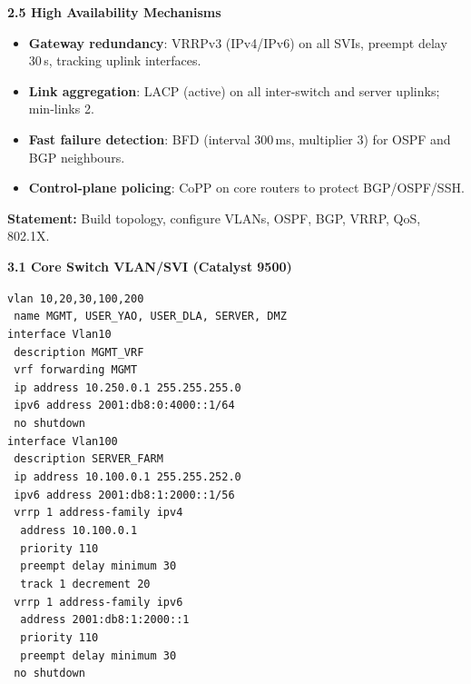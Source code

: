 \documentclass[11pt]{article}
\begin{document}
\begin{exoresolu}
\textbf{2.5 High Availability Mechanisms}
\begin{itemize}
    \item \textbf{Gateway redundancy}: VRRPv3 (IPv4/IPv6) on all SVIs, preempt delay 30\,s, tracking uplink interfaces.
    \item \textbf{Link aggregation}: LACP (active) on all inter-switch and server uplinks; min-links 2.
    \item \textbf{Fast failure detection}: BFD (interval 300\,ms, multiplier 3) for OSPF and BGP neighbours.
    \item \textbf{Control-plane policing}: CoPP on core routers to protect BGP/OSPF/SSH.
\end{itemize}
\end{exoresolu}

\begin{exoresolu}
\textbf{Statement:} Build topology, configure VLANs, OSPF, BGP, VRRP, QoS, 802.1X.

\tcblower
\textbf{3.1 Core Switch VLAN/SVI (Catalyst 9500)}\par
\texttt{vlan 10,20,30,100,200}\\
\texttt{\ name MGMT, USER\_YAO, USER\_DLA, SERVER, DMZ}\\
\texttt{interface Vlan10}\\
\texttt{\ description MGMT\_VRF}\\
\texttt{\ vrf forwarding MGMT}\\
\texttt{\ ip address 10.250.0.1 255.255.255.0}\\
\texttt{\ ipv6 address 2001:db8:0:4000::1/64}\\
\texttt{\ no shutdown}\\
\texttt{interface Vlan100}\\
\texttt{\ description SERVER\_FARM}\\
\texttt{\ ip address 10.100.0.1 255.255.252.0}\\
\texttt{\ ipv6 address 2001:db8:1:2000::1/56}\\
\texttt{\ vrrp 1 address-family ipv4}\\
\texttt{\ \ address 10.100.0.1}\\
\texttt{\ \ priority 110}\\
\texttt{\ \ preempt delay minimum 30}\\
\texttt{\ \ track 1 decrement 20}\\
\texttt{\ vrrp 1 address-family ipv6}\\
\texttt{\ \ address 2001:db8:1:2000::1}\\
\texttt{\ \ priority 110}\\
\texttt{\ \ preempt delay minimum 30}\\
\texttt{\ no shutdown}


\end{exoresolu}
\end{document}
